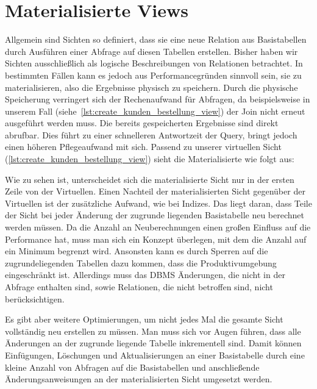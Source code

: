 \section{Materialisierte Views}\label{sec:materialisierte-views}

Allgemein sind Sichten so definiert, dass sie eine neue Relation aus Basistabellen durch Ausführen einer Abfrage auf diesen Tabellen erstellen.
Bisher haben wir Sichten ausschließlich als logische Beschreibungen von Relationen betrachtet.
In bestimmten Fällen kann es jedoch aus Performancegründen sinnvoll sein, sie zu materialisieren, also die Ergebnisse physisch zu speichern.
Durch die physische Speicherung verringert sich der Rechenaufwand für Abfragen, da beispielsweise in unserem Fall (siehe~\ref{lst:create_kunden_bestellung_view}) der Join nicht erneut ausgeführt werden muss.
Die bereits gespeicherten Ergebnisse sind direkt abrufbar.
Dies führt zu einer schnelleren Antwortzeit der Query, bringt jedoch einen höheren Pflegeaufwand mit sich.
Passend zu unserer virtuellen Sicht (\ref{lst:create_kunden_bestellung_view}) sieht die Materialisierte wie folgt aus:

\vspace{-5pt}


Wie zu sehen ist, unterscheidet sich die materialisierte Sicht nur in der ersten Zeile von der Virtuellen.
Einen Nachteil der materialisierten Sicht gegenüber der Virtuellen ist der zusätzliche Aufwand, wie bei Indizes.
Das liegt daran, dass Teile der Sicht bei jeder Änderung der zugrunde liegenden Basistabelle neu berechnet werden müssen.
Da die Anzahl an Neuberechnungen einen großen Einfluss auf die Performance hat, muss man sich ein Konzept überlegen, mit dem die Anzahl auf ein Minimum begrenzt wird.
Ansonsten kann es durch Sperren auf die zugrundeliegenden Tabellen dazu kommen, dass die Produktivumgebung eingeschränkt ist.
Allerdings muss das DBMS Änderungen, die nicht in der Abfrage enthalten sind, sowie Relationen, die nicht betroffen sind, nicht berücksichtigen.

Es gibt aber weitere Optimierungen, um nicht jedes Mal die gesamte Sicht vollständig neu erstellen zu müssen.
Man muss sich vor Augen führen, dass alle Änderungen an der zugrunde liegende Tabelle inkrementell sind.
Damit können Einfügungen, Löschungen und Aktualisierungen an einer Basistabelle durch eine kleine Anzahl von Abfragen auf die Basistabellen und anschließende Änderungsanweisungen an der materialisierten Sicht umgesetzt werden.

